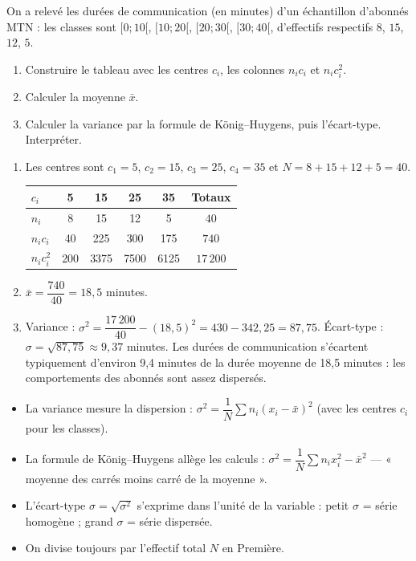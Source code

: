 \documentclass[11pt]{article}
\newcommand{\cle}[1]{{\popxbold\color{popdark}#1}}
\begin{document}
\begin{exercice}
On a relevé les durées de communication (en minutes) d'un échantillon d'abonnés MTN : les classes sont $[0;10[$, $[10;20[$, $[20;30[$, $[30;40[$, d'effectifs respectifs $8$, $15$, $12$, $5$.
\begin{enumerate}
\item Construire le tableau avec les centres $c_i$, les colonnes $n_i c_i$ et $n_i c_i^2$.
\item Calculer la moyenne $\bar{x}$.
\item Calculer la variance par la formule de König–Huygens, puis l'écart-type. Interpréter.
\end{enumerate}
\end{exercice}

\begin{corrige}
\begin{enumerate}
\item Les centres sont $c_1 = 5$, $c_2 = 15$, $c_3 = 25$, $c_4 = 35$ et $N = 8+15+12+5 = 40$.
\begin{center}
\begin{tabular}{|l|ccccc|}
\hline
\rowcolor{popblueL} $c_i$ & 5 & 15 & 25 & 35 & \textbf{Totaux} \\
\hline
$n_i$ & 8 & 15 & 12 & 5 & $40$ \\
\hline
$n_i c_i$ & 40 & 225 & 300 & 175 & $740$ \\
\hline
$n_i c_i^2$ & 200 & 3375 & 7500 & 6125 & $17\,200$ \\
\hline
\end{tabular}
\end{center}
\item $\bar{x} = \dfrac{740}{40} = 18{,}5$ minutes.
\item Variance : $\sigma^2 = \dfrac{17\,200}{40} - (18{,}5)^2 = 430 - 342{,}25 = 87{,}75$. Écart-type : $\sigma = \sqrt{87{,}75} \approx 9{,}37$ minutes. Les durées de communication s'écartent typiquement d'environ 9,4 minutes de la durée moyenne de 18,5 minutes : les comportements des abonnés sont assez dispersés.
\end{enumerate}
\end{corrige}

\begin{aretenir}
\begin{itemize}
\item La \cle{variance} mesure la dispersion : $\sigma^2 = \dfrac{1}{N}\sum n_i (x_i - \bar{x})^2$ (avec les centres $c_i$ pour les classes).
\item La formule de \cle{König–Huygens} allège les calculs : $\sigma^2 = \dfrac{1}{N}\sum n_i x_i^2 - \bar{x}^2$ — « moyenne des carrés moins carré de la moyenne ».
\item L'\cle{écart-type} $\sigma = \sqrt{\sigma^2}$ s'exprime dans l'unité de la variable : petit $\sigma$ = série homogène ; grand $\sigma$ = série dispersée.
\item On divise toujours par l'effectif total $N$ en Première.
\end{itemize}
\end{aretenir}
\end{document}
